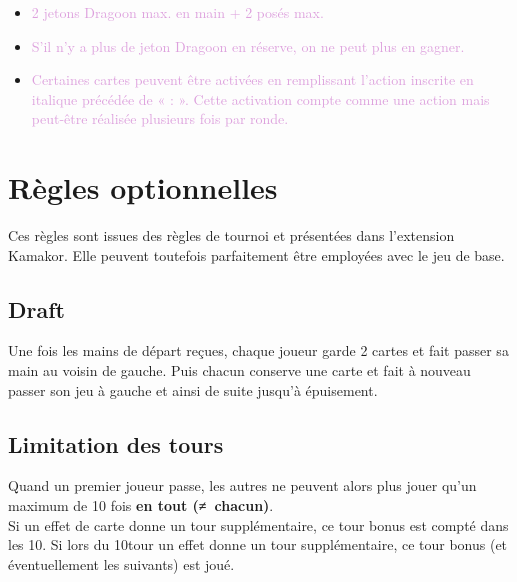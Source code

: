 \documentclass[10pt, a4paper]{article}	%
\begin{document}
\begin{multicols}{3}
\begin{itemize}
	\item \textcolor{Plum}{2 jetons Dragoon max. en main + 2 posés max.}
	\item \textcolor{Plum}{S’il n’y a plus de jeton Dragoon en réserve, on ne peut plus en gagner.}
	\item \textcolor{Plum}{Certaines cartes peuvent être activées en remplissant l’action inscrite en italique précédée de « : ». Cette activation compte comme une action mais peut-être réalisée plusieurs fois par ronde.}
\end{itemize}



\section{Règles optionnelles}
\label{sec:regles_optionnelles}

Ces règles sont issues des règles de tournoi et présentées dans l’extension Kamakor. Elle peuvent toutefois parfaitement être employées avec le jeu de base.

\subsection*{Draft}
Une fois les mains de départ reçues, chaque joueur garde 2 cartes et fait passer sa main au voisin de gauche. Puis chacun conserve une carte et fait à nouveau passer son jeu à gauche et ainsi de suite jusqu’à épuisement.


\subsection*{Limitation des tours}
Quand un premier joueur passe, les autres ne peuvent alors plus jouer qu’un maximum de 10 fois \textbf{en tout (≠ chacun)}.\\
Si un effet de carte donne un tour supplémentaire, ce tour bonus est compté dans les 10.
Si lors du 10\ieme tour un effet donne un tour supplémentaire, ce tour bonus (et éventuellement les suivants) est joué.



\end{multicols}
\end{document}
